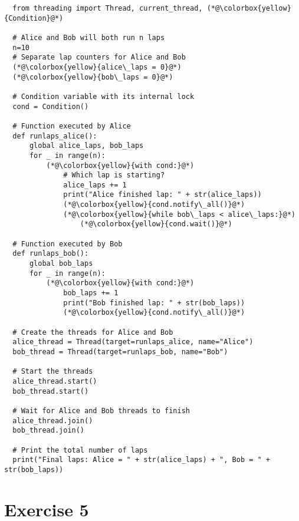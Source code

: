 \documentclass{article}
\newcommand{\exercise}[1]{
    \section*{Exercise #1}
    \markboth{Exercise #1}{}
}
\begin{document}
\begin{enumerate}[label=\textbf{\makebox[1cm][l]{\Huge\text{(\stylishfont\alph*)}}}, leftmargin=!, labelindent=0pt]
\begin{lstlisting}
  from threading import Thread, current_thread, (*@\colorbox{yellow}{Condition}@*)

  # Alice and Bob will both run n laps
  n=10
  # Separate lap counters for Alice and Bob
  (*@\colorbox{yellow}{alice\_laps = 0}@*)
  (*@\colorbox{yellow}{bob\_laps = 0}@*)
  
  # Condition variable with its internal lock
  cond = Condition()
  
  # Function executed by Alice
  def runlaps_alice():
      global alice_laps, bob_laps
      for _ in range(n):
          (*@\colorbox{yellow}{with cond:}@*)
              # Which lap is starting?
              alice_laps += 1
              print("Alice finished lap: " + str(alice_laps))
              (*@\colorbox{yellow}{cond.notify\_all()}@*)
              (*@\colorbox{yellow}{while bob\_laps < alice\_laps:}@*)
                  (*@\colorbox{yellow}{cond.wait()}@*)
  
  # Function executed by Bob
  def runlaps_bob():
      global bob_laps
      for _ in range(n):
          (*@\colorbox{yellow}{with cond:}@*)
              bob_laps += 1
              print("Bob finished lap: " + str(bob_laps))
              (*@\colorbox{yellow}{cond.notify\_all()}@*)
  
  # Create the threads for Alice and Bob
  alice_thread = Thread(target=runlaps_alice, name="Alice")
  bob_thread = Thread(target=runlaps_bob, name="Bob")
  
  # Start the threads
  alice_thread.start()
  bob_thread.start()
  
  # Wait for Alice and Bob threads to finish
  alice_thread.join()
  bob_thread.join()
  
  # Print the total number of laps
  print("Final laps: Alice = " + str(alice_laps) + ", Bob = " + str(bob_laps))
  \end{lstlisting}


\end{enumerate}








\newpage

\exercise{5}






\newpage
\printbibliography
\end{document}
